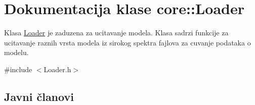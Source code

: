 \hypertarget{classcore_1_1Loader}{}\section{Dokumentacija klase core\+:\+:Loader}
\label{classcore_1_1Loader}


Klasa \hyperlink{classcore_1_1Loader}{Loader} je zaduzena za ucitavanje modela. Klasa sadrzi funkcije za ucitavanje raznih vrsta modela iz sirokog spektra fajlova za cuvanje podataka o modelu.  




{\ttfamily \#include $<$Loader.\+h$>$}

\subsection*{Javni članovi}
